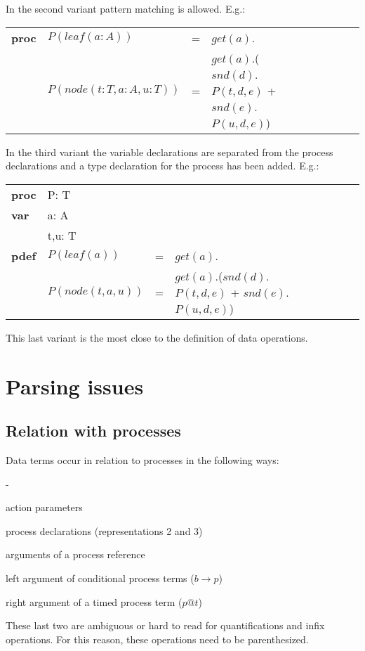 \documentclass[a4paper,fleqn]{article}
\makeatletter
\newenvironment{tdefinitions}[2][0.15em]
  {\begin{list}%
    {#2}%
    {\setlength{\parsep}{0pt}%
     \setlength{\itemsep}{#1}%
     \setlength{\leftmargin}{\mathindent}%
     \setlength{\labelwidth}{\mathindent - \labelsep}%
    }
  }
  {\end{list}}
\newcommand{\frm}[1]{\mbox{\ensuremath{#1}}}
\newcommand{\f}[1]{\ensuremath{\mathit{#1}}}
\newcommand{\fa}[2]{\ensuremath{\f{#1}(#2)}}
\newcommand{\faaa}[4]{\ensuremath{\f{#1}(#2, #3, #4)}}
\newcommand{\To}{\ensuremath{\rightarrow}}
\newlength{\tlength}
\newenvironment{genspect}%
{\par\bigskip\noindent%
 \begin{tabular}{@{}>{\bf}p{2.3em}L@{\ }L@{\ }L@{\ }L@{\ }L@{\ }L@{\ }L@{\ }L}%
}%
{\end{tabular}\bigskip\par%
}
\makeatother
\begin{document}
\noindent
In the second variant pattern matching is allowed. E.g.:
\begin{genspect}
proc & \fa{P}{\fa{leaf}{a: A}}               & = & \fa{get}{a}.\delta\\
     & \fa{P}{\faaa{node}{t: T}{a: A}{u: T}} & = & 
       \fa{get}{a}.(\fa{snd}{d}.\faaa{P}{t}{d}{e} + \fa{snd}{e}.\faaa{P}{u}{d}{e})
\end{genspect}

\noindent
In the third variant the variable declarations are separated from the process declarations and a type declaration for the process has been added. E.g.:
\begin{genspect}
proc & P: T\\
var  & a: A\\
     & t,u: T\\
pdef & \fa{P}{\fa{leaf}{a}}         & = & \fa{get}{a}.\delta\\
     & \fa{P}{\faaa{node}{t}{a}{u}} & = & 
       \fa{get}{a}.(\fa{snd}{d}.\faaa{P}{t}{d}{e} + \fa{snd}{e}.\faaa{P}{u}{d}{e})    
\end{genspect}
\noindent
This last variant is the most close to the definition of data operations.

\section{Parsing issues}

\subsection{Relation with processes}

\noindent
Data terms occur in relation to processes in the following ways:
\begin{tdefinitions}{-}
\item action parameters
\item process declarations (representations 2 and 3)
\item arguments of a process reference
\item left argument of conditional process terms (\frm{b \To p})
\item right argument of a timed process term (\frm{p @ t})
\end{tdefinitions}

\noindent
These last two are ambiguous or hard to read for quantifications and infix operations. For this reason, these operations need to be parenthesized.
\end{document}
